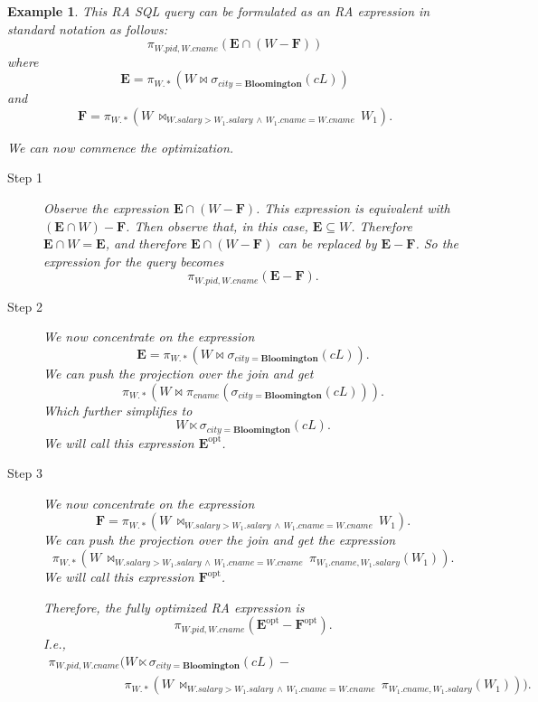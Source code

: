 \documentclass[11pt]{article}
\newcommand{\project}[2]{\pi_{#1}(#2)}
\newcommand{\join}[3]{#1\,\bowtie_{#2}\,#3}
\newcommand{\naturaljoin}[2]{#1\bowtie #2}
\newtheorem{example}{Example}
\begin{document}
\begin{example}
This RA SQL query can be formulated as an RA expression in standard notation as follows:
\[\project{W.pid,W.cname}{\mathbf{E}\cap(W - \mathbf{F})}\]
where
\[\mathbf{E} = \project{W.*}{\naturaljoin{W}{\sigma_{city = \mathbf{Bloomington} }(cL)}}\]
and
\[\mathbf{F} = \project{W.*}{\join{W}{W.salary > W_1.salary\,\land\,W_1.cname = W.cname}{W_1}}.\]

We can now commence the optimization.

\begin{description}
\item[Step 1] Observe the expression $\mathbf{E}\cap(W-\mathbf{F})$.   This expression is equivalent with $(\mathbf{E}\cap W) - \mathbf{F}$.   Then observe that, in this case,
$\mathbf{E} \subseteq W$.   Therefore $\mathbf{E}\cap W = \mathbf{E}$, and therefore $\mathbf{E}\cap(W-\mathbf{F})$ can be replaced by 
$\mathbf{E}-\mathbf{F}$.
So the expression for the query becomes 
\[\project{W.pid,W.cname}{\mathbf{E} -\mathbf{F}}.\] 

\item[Step 2] We now concentrate on the expression
\[\mathbf{E} = \project{W.*}{\naturaljoin{W}{\sigma_{city = \mathbf{Bloomington} }(cL)}}.\]
We can push the projection over the join and get
\[\project{W.*}{W \bowtie \project{cname}{\sigma_{city = \mathbf{Bloomington}}(cL)}}.\]
Which further simplifies to \[W\ltimes \sigma_{city = \mathbf{Bloomington}}(cL).\]
We will call this expression $\mathbf{E}^{\text{opt}}$.

\item[Step 3] We now concentrate on the expression
\[\mathbf{F} = \project{W.*}{\join{W}{W.salary > W_1.salary\,\land\,W_1.cname = W.cname}{W_1}}.\]
We can push the projection over the join and get the expression
\[\project{W.*}{\join{W}{W.salary > W_1.salary\,\land\,W_1.cname = W.cname}{\project{W_1.cname, W_1.salary}{W_1}}}.\]
We will call this expression $\mathbf{F}^{\text{opt}}$.

Therefore, the fully optimized RA expression is
\[\project{W.pid,W.cname}{\mathbf{E}^{\text{opt}} - \mathbf{F}^{\text{opt}}}.\]
I.e.,
\[
\begin{array}{l}
\project{W.pid,W.cname}{W\ltimes \sigma_{city = \mathbf{Bloomington}}(cL) - \\
\qquad\qquad\qquad \project{W.*}{\join{W}{W.salary > W_1.salary\,\land\,W_1.cname = W.cname}{\project{W_1.cname, W_1.salary}{W_1}}}}.
\end{array}
\]


\end{description}
\end{example}
\end{document}
